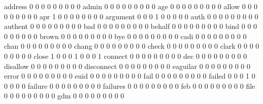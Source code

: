 \documentclass[compress,8pt]{beamer}
\begin{document}
\begin{frame}
\begin{Schunk}
  address                                    0   0   0   0   0   0   0   0   0
  admin                                      0   0   0   0   0   0   0   0   0
  age                                        0   0   0   0   0   0   0   0   0
  allow                                      0   0   0   0   0   0   0   0   0
  apr                                        1   0   0   0   0   0   0   0   0
  argument                                   0   0   0   1   0   0   0   0   0
  auth                                       0   0   0   0   0   0   0   0   0
  authent                                    0   0   0   0   0   0   0   0   0
  bad                                        0   0   0   0   0   0   0   0   0
  behalf                                     0   0   0   0   0   0   0   0   0
  bind                                       0   0   0   0   0   0   0   0   0
  brown                                      0   0   0   0   0   0   0   0   0
  bye                                        0   0   0   0   0   0   0   0   0
  cadi                                       0   0   0   0   0   0   0   0   0
  chan                                       0   0   0   0   0   0   0   0   0
  chang                                      0   0   0   0   0   0   0   0   0
  check                                      0   0   0   0   0   0   0   0   0
  clark                                      0   0   0   0   0   0   0   0   0
  close                                      1   0   0   0   1   0   0   0   1
  connect                                    0   0   0   0   0   0   0   0   0
  dec                                        0   0   0   0   0   0   0   0   0
  disallow                                   0   0   0   0   0   0   0   0   0
  disconnect                                 0   0   0   0   0   0   0   0   0
  eaguilar                                   0   0   0   0   0   0   0   0   0
  error                                      0   0   0   0   0   0   0   0   0
  euid                                       0   0   0   0   0   0   0   0   0
  fail                                       0   0   0   0   0   0   0   0   0
  failed                                     0   0   0   1   0   0   0   0   0
  failure                                    0   0   0   0   0   0   0   0   0
  failures                                   0   0   0   0   0   0   0   0   0
  feb                                        0   0   0   0   0   0   0   0   0
  file                                       0   0   0   0   0   0   0   0   0
  gdm                                        0   0   0   0   0   0   0   0   0

\end{Schunk}
\end{frame}
\end{document}
